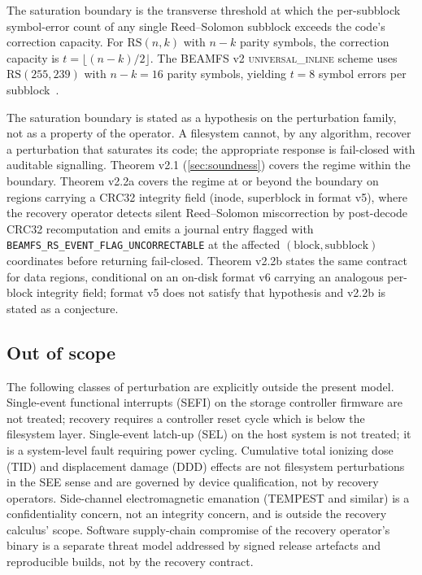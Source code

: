 The saturation boundary is the transverse threshold at which the
per-subblock symbol-error count of any single Reed--Solomon
subblock exceeds the code's correction capacity. For
\(\mathrm{RS}(n, k)\) with \(n - k\) parity symbols, the
correction capacity is \(t = \lfloor (n-k)/2 \rfloor\). The BEAMFS v2
\textsc{universal\_inline} scheme uses \(\mathrm{RS}(255, 239)\) with \(n - k = 16\)
parity symbols, yielding \(t = 8\) symbol errors per
subblock~\cite{kernelrslib}.

The saturation boundary is stated as a hypothesis on the
perturbation family, not as a property of the operator. A
filesystem cannot, by any algorithm, recover a perturbation that
saturates its code; the appropriate response is fail-closed with
auditable signalling. Theorem v2.1 (\cref{sec:soundness}) covers
the regime within the boundary. Theorem v2.2a covers the regime
at or beyond the boundary on regions carrying a CRC32 integrity
field (inode, superblock in format v5), where the recovery operator
detects silent Reed--Solomon miscorrection by post-decode CRC32
recomputation and emits a journal entry flagged with
\texttt{BEAMFS\_RS\_EVENT\_FLAG\_UNCORRECTABLE} at the affected
\((\text{block}, \text{subblock})\) coordinates before returning
fail-closed. Theorem v2.2b states the same contract for data
regions, conditional on an on-disk format v6 carrying an analogous
per-block integrity field; format v5 does not satisfy that
hypothesis and v2.2b is stated as a conjecture.

\subsection{Out of scope}

The following classes of perturbation are explicitly outside the
present model. Single-event functional interrupts (SEFI) on the
storage controller firmware are not treated; recovery requires a
controller reset cycle which is below the filesystem layer.
Single-event latch-up (SEL) on the host system is not treated; it
is a system-level fault requiring power cycling. Cumulative total
ionizing dose (TID) and displacement damage (DDD) effects are not
filesystem perturbations in the SEE sense and are governed by
device qualification, not by recovery operators. Side-channel
electromagnetic emanation (TEMPEST and similar) is a
confidentiality concern, not an integrity concern, and is outside
the recovery calculus' scope. Software supply-chain compromise of
the recovery operator's binary is a separate threat model addressed
by signed release artefacts and reproducible builds, not by the
recovery contract.

